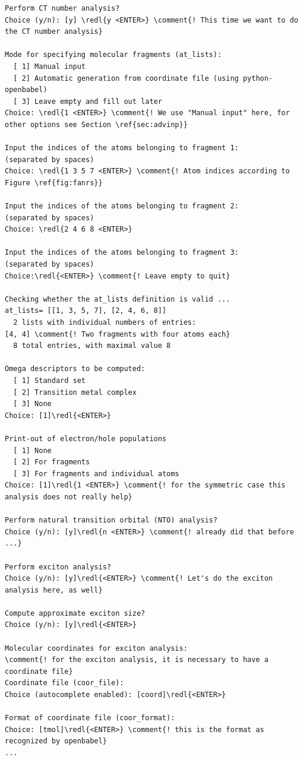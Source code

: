 \documentclass[DIV=12,headings=normal]{scrartcl}
\newcommand{\comment}[1]{\textcolor{blue}{#1}}
\newcommand{\redl}[1]{{\textcolor{red}{\underline{#1}}}}
\newcounter{number}
\begin{document}
\scriptsize
\begin{Verbatim}[commandchars=\\\{\}]
Perform CT number analysis?
Choice (y/n): [y] \redl{y <ENTER>} \comment{! This time we want to do the CT number analysis}

Mode for specifying molecular fragments (at_lists):
  [ 1] Manual input
  [ 2] Automatic generation from coordinate file (using python-openbabel)
  [ 3] Leave empty and fill out later
Choice: \redl{1 <ENTER>} \comment{! We use "Manual input" here, for other options see Section \ref{sec:advinp}}

Input the indices of the atoms belonging to fragment 1:
(separated by spaces)
Choice: \redl{1 3 5 7 <ENTER>} \comment{! Atom indices according to Figure \ref{fig:fanrs}}

Input the indices of the atoms belonging to fragment 2:
(separated by spaces)
Choice: \redl{2 4 6 8 <ENTER>}

Input the indices of the atoms belonging to fragment 3:
(separated by spaces)
Choice:\redl{<ENTER>} \comment{! Leave empty to quit}

Checking whether the at_lists definition is valid ...
at_lists= [[1, 3, 5, 7], [2, 4, 6, 8]]
  2 lists with individual numbers of entries:
[4, 4] \comment{! Two fragments with four atoms each}
  8 total entries, with maximal value 8

Omega descriptors to be computed:
  [ 1] Standard set
  [ 2] Transition metal complex
  [ 3] None
Choice: [1]\redl{<ENTER>}

Print-out of electron/hole populations
  [ 1] None
  [ 2] For fragments
  [ 3] For fragments and individual atoms
Choice: [1]\redl{1 <ENTER>} \comment{! for the symmetric case this analysis does not really help}

Perform natural transition orbital (NTO) analysis?
Choice (y/n): [y]\redl{n <ENTER>} \comment{! already did that before ...}

Perform exciton analysis?
Choice (y/n): [y]\redl{<ENTER>} \comment{! Let's do the exciton analysis here, as well}

Compute approximate exciton size?
Choice (y/n): [y]\redl{<ENTER>}

Molecular coordinates for exciton analysis:
\comment{! for the exciton analysis, it is necessary to have a coordinate file}
Coordinate file (coor_file):
Choice (autocomplete enabled): [coord]\redl{<ENTER>}

Format of coordinate file (coor_format):
Choice: [tmol]\redl{<ENTER>} \comment{! this is the format as recognized by openbabel}
...
\end{Verbatim}
\normalsize
%
\end{document}
